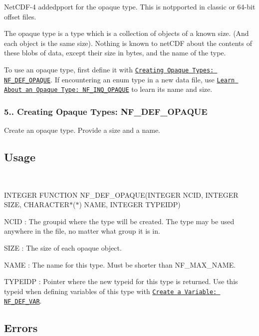 Net\+C\+D\+F-\/4 addedpport for the opaque type. This is notpported in classic or 64-\/bit offset files.

The opaque type is a type which is a collection of objects of a known size. (And each object is the same size). Nothing is known to net\+C\+DF about the contents of these blobs of data, except their size in bytes, and the name of the type.

To use an opaque type, first define it with \href{#NF_005fDEF_005fOPAQUE}{\tt Creating Opaque Types\+: N\+F\+\_\+\+D\+E\+F\+\_\+\+O\+P\+A\+Q\+UE}. If encountering an enum type in a new data file, use \href{#NF_005fINQ_005fOPAQUE}{\tt Learn About an Opaque Type\+: N\+F\+\_\+\+I\+N\+Q\+\_\+\+O\+P\+A\+Q\+UE} to learn its name and size.

\subsubsection*{5.. Creating Opaque Types\+: N\+F\+\_\+\+D\+E\+F\+\_\+\+O\+P\+A\+Q\+UE}

Create an opaque type. Provide a size and a name.

\subsection*{Usage }

 

I\+N\+T\+E\+G\+ER F\+U\+N\+C\+T\+I\+ON N\+F\+\_\+\+D\+E\+F\+\_\+\+O\+P\+A\+Q\+UE(I\+N\+T\+E\+G\+ER N\+C\+ID, I\+N\+T\+E\+G\+ER S\+I\+ZE, C\+H\+A\+R\+A\+C\+T\+E\+R$\ast$($\ast$) N\+A\+ME, I\+N\+T\+E\+G\+ER T\+Y\+P\+E\+I\+DP)

{\ttfamily N\+C\+ID} \+: The groupid where the type will be created. The type may be used anywhere in the file, no matter what group it is in.

{\ttfamily S\+I\+ZE} \+: The size of each opaque object.

{\ttfamily N\+A\+ME} \+: The name for this type. Must be shorter than N\+F\+\_\+\+M\+A\+X\+\_\+\+N\+A\+ME.

{\ttfamily T\+Y\+P\+E\+I\+DP} \+: Pointer where the new typeid for this type is returned. Use this typeid when defining variables of this type with \href{#NF_005fDEF_005fVAR}{\tt Create a Variable\+: {\ttfamily N\+F\+\_\+\+D\+E\+F\+\_\+\+V\+AR}}.

\subsection*{Errors }

